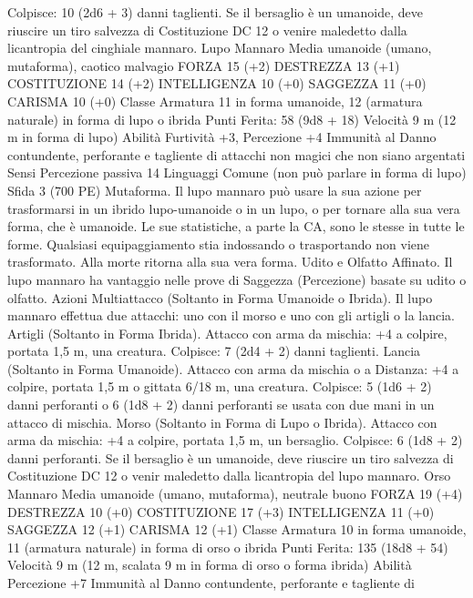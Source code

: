 \begin{multicols}{2}
Colpisce: 10 (2d6 + 3) danni taglienti. Se il bersaglio è un
umanoide, deve riuscire un tiro salvezza di Costituzione DC 12 o
venire maledetto dalla licantropia del cinghiale mannaro.
Lupo Mannaro
Media umanoide (umano, mutaforma), caotico malvagio
FORZA 15 (+2)
DESTREZZA 13 (+1)
COSTITUZIONE 14 (+2)
INTELLIGENZA 10 (+0)
SAGGEZZA 11 (+0)
CARISMA 10 (+0)
Classe Armatura 11 in forma umanoide, 12 (armatura naturale)
in forma di lupo o ibrida
\hspace*{0pt}\hfill{Punti Ferita}: 58 (9d8 + 18)
Velocità 9 m (12 m in forma di lupo)
Abilità Furtività +3, Percezione +4
Immunità al Danno contundente, perforante e tagliente di
attacchi non magici che non siano argentati
Sensi Percezione passiva 14
Linguaggi Comune (non può parlare in forma di lupo)
Sfida 3 (700 PE)
Mutaforma. Il lupo mannaro può usare la sua azione per
trasformarsi in un ibrido lupo-umanoide o in un lupo, o per
tornare alla sua vera forma, che è umanoide. Le sue statistiche, a
parte la CA, sono le stesse in tutte le forme. Qualsiasi
equipaggiamento stia indossando o trasportando non viene
trasformato. Alla morte ritorna alla sua vera forma.
Udito e Olfatto Affinato. Il lupo mannaro ha vantaggio nelle
prove di Saggezza (Percezione) basate su udito o olfatto.
Azioni
Multiattacco (Soltanto in Forma Umanoide o Ibrida). Il lupo
mannaro effettua due attacchi: uno con il morso e uno con gli
artigli o la lancia.
Artigli (Soltanto in Forma Ibrida). Attacco con arma da
mischia: +4 a colpire, portata 1,5 m, una creatura.
Colpisce: 7 (2d4 + 2) danni taglienti.
Lancia (Soltanto in Forma Umanoide). Attacco con arma da
mischia o a Distanza: +4 a colpire, portata 1,5 m o gittata 6/18
m, una creatura.
Colpisce: 5 (1d6 + 2) danni perforanti o 6 (1d8 + 2) danni
perforanti se usata con due mani in un attacco di mischia.
Morso (Soltanto in Forma di Lupo o Ibrida). Attacco con arma
da mischia: +4 a colpire, portata 1,5 m, un bersaglio.
Colpisce: 6 (1d8 + 2) danni perforanti. Se il bersaglio è un
umanoide, deve riuscire un tiro salvezza di Costituzione DC 12 o
venir maledetto dalla licantropia del lupo mannaro.
Orso Mannaro
Media umanoide (umano, mutaforma), neutrale buono
FORZA 19 (+4)
DESTREZZA 10 (+0)
COSTITUZIONE 17 (+3)
INTELLIGENZA 11 (+0)
SAGGEZZA 12 (+1)
CARISMA 12 (+1)
Classe Armatura 10 in forma umanoide, 11 (armatura naturale)
in forma di orso o ibrida
\hspace*{0pt}\hfill{Punti Ferita}: 135 (18d8 + 54)
Velocità 9 m (12 m, scalata 9 m in forma di orso o forma ibrida)
Abilità Percezione +7
Immunità al Danno contundente, perforante e tagliente di

\end{multicols}
